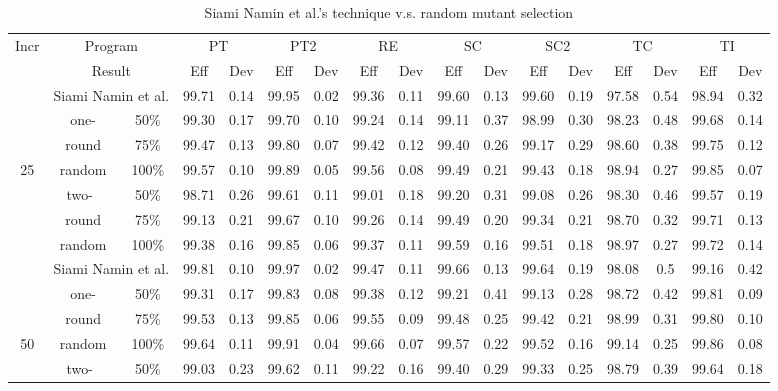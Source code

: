 \begin{table*}[t]
\caption{\label{tab:Ran-SiamiNamin} Siami Namin et al.'s technique
v.s. random mutant selection} \centering \hspace*{-0.8cm}
\begin{tabular}{|c||c|c||c|c||c|c||c|c||c|c||c|c||c|c||c|c|}
  \hline
  Incr&\multicolumn{2}{|c||}{Program}
  &\multicolumn{2}{|c||}{PT}&\multicolumn{2}{|c||}{PT2}&\multicolumn{2}{|c||}{RE}&\multicolumn{2}{|c||}{SC}&\multicolumn{2}{|c||}{SC2}&\multicolumn{2}{|c||}{TC}&\multicolumn{2}{|c|}{TI}\\
  \cline{2-17}
  ~&\multicolumn{2}{|c||}{Result}
  &Eff&Dev&Eff&Dev&Eff&Dev&Eff&Dev&Eff&Dev&Eff&Dev&Eff&Dev\\
  \hline
  \hline
  ~&\multicolumn{2}{|c||}{Siami Namin et al.}&99.71&0.14&99.95&0.02&99.36&0.11&99.60&0.13&99.60&0.19&97.58&0.54&98.94&0.32\\
  \cline{2-17}
  ~&one-&50\%&99.30&0.17&99.70&0.10&99.24&0.14&99.11&0.37&98.99&0.30&98.23&0.48&99.68&0.14\\
  \cline{3-17}
  ~&round&75\%&99.47&0.13&99.80&0.07&99.42&0.12&99.40&0.26&99.17&0.29&98.60&0.38&99.75&0.12\\
  \cline{3-17}
  25&random&100\%&99.57&0.10&99.89&0.05&99.56&0.08&99.49&0.21&99.43&0.18&98.94&0.27&99.85&0.07\\
  \cline{2-17}
  ~&two-~&50\%&98.71&0.26&99.61&0.11&99.01&0.18&99.20&0.31&99.08&0.26&98.30&0.46&99.57&0.19\\
  \cline{3-17}
  ~&round&75\%&99.13&0.21&99.67&0.10&99.26&0.14&99.49&0.20&99.34&0.21&98.70&0.32&99.71&0.13\\
  \cline{3-17}
  ~&random&100\%&99.38&0.16&99.85&0.06&99.37&0.11&99.59&0.16&99.51&0.18&98.97&0.27&99.72&0.14\\
  \hline
  \hline
  ~&\multicolumn{2}{|c||}{Siami Namin et al.}&99.81&0.10&99.97&0.02&99.47&0.11&99.66&0.13&99.64&0.19&98.08&0.5&99.16&0.42\\
  \cline{2-17}
  ~&one-&50\%&99.31&0.17&99.83&0.08&99.38&0.12&99.21&0.41&99.13&0.28&98.72&0.42&99.81&0.09\\
  \cline{3-17}
  ~&round&75\%&99.53&0.13&99.85&0.06&99.55&0.09&99.48&0.25&99.42&0.21&98.99&0.31&99.80&0.10\\
  \cline{3-17}
  50&random&100\%&99.64&0.11&99.91&0.04&99.66&0.07&99.57&0.22&99.52&0.16&99.14&0.25&99.86&0.08\\
  \cline{2-17}
  ~&two-~&50\%&99.03&0.23&99.62&0.11&99.22&0.16&99.40&0.29&99.33&0.25&98.79&0.39&99.64&0.18\\

\end{tabular}
\end{table*}
